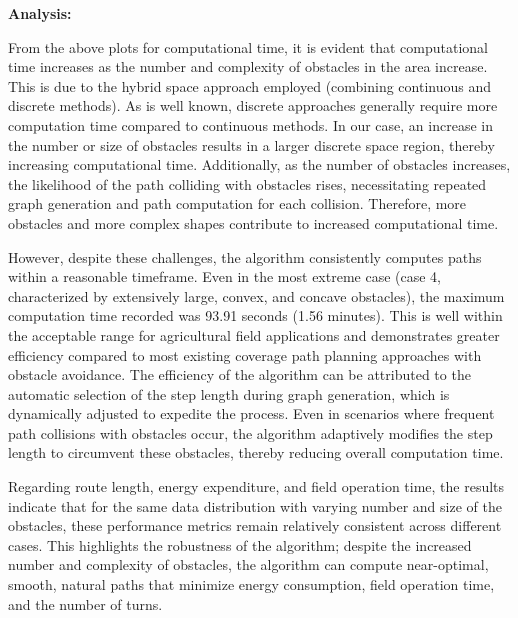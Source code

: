 

\textbf{Analysis: }

From the above plots for computational time, it is evident that computational time increases as the number and complexity of obstacles in the area increase. This is due to the hybrid space approach employed (combining continuous and discrete methods). As is well known, discrete approaches generally require more computation time compared to continuous methods. In our case, an increase in the number or size of obstacles results in a larger discrete space region, thereby increasing computational time. Additionally, as the number of obstacles increases, the likelihood of the path colliding with obstacles rises, necessitating repeated graph generation and path computation for each collision. Therefore, more obstacles and more complex shapes contribute to increased computational time.


\vspace*{6mm}

However, despite these challenges, the algorithm consistently computes paths within a reasonable timeframe. Even in the most extreme case (case 4, characterized by extensively large, convex, and concave obstacles), the maximum computation time recorded was 93.91 seconds (1.56 minutes). This is well within the acceptable range for agricultural field applications and demonstrates greater efficiency compared to most existing coverage path planning approaches with obstacle avoidance. The efficiency of the algorithm can be attributed to the automatic selection of the step length during graph generation, which is dynamically adjusted to expedite the process. Even in scenarios where frequent path collisions with obstacles occur, the algorithm adaptively modifies the step length to circumvent these obstacles, thereby reducing overall computation time.


\vspace*{6mm}

Regarding route length, energy expenditure, and field operation time, the results indicate that for the same data distribution with varying number and size of the obstacles, these performance metrics remain relatively consistent across different cases. This highlights the robustness of the algorithm; despite the increased number and complexity of obstacles, the algorithm can compute near-optimal, smooth, natural paths that minimize energy consumption, field operation time, and the number of turns.
